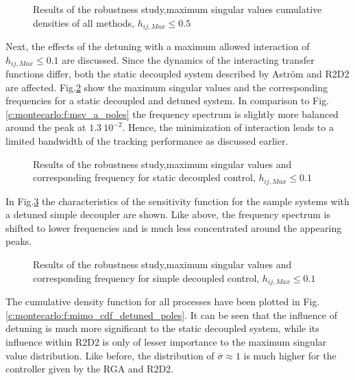 \begin{figure}[H]\centering

\caption{Results of the robustness study,maximum singular values cumulative densities of all methods, $h_{ij,Max} \leq 0.5$}
\label{c:montecarlo:f:mimo_cdf_poles}
\end{figure}

Next, the effects of the detuning with a maximum allowed interaction of $h_{ij,Max} \leq 0.1$ are discussed. Since the dynamics of the interacting transfer functions differ, both the static decoupled system described by Astr\"om and R2D2 are affected. Fig.\ref{c:montecarlo:f:msv_a_detuned_poles} show the maximum singular values and the corresponding frequencies for a static decoupled and detuned system. In comparison to Fig.\ref{c:montecarlo:f:msv_a_poles} the frequency spectrum is slightly more balanced around the peak at $1.3~10^{-2}$. Hence, the minimization of interaction leads to a limited bandwidth of the tracking performance as discussed earlier. 

\begin{figure}[H]\centering

\caption{Results of the robustness study,maximum singular values and corresponding frequency for static decoupled control, $h_{ij,Max} \leq 0.1$}
\label{c:montecarlo:f:msv_a_detuned_poles}
\end{figure}

In Fig.\ref{c:montecarlo:f:msv_d_detuned_poles} the characteristics of the sensitivity function for the sample systems with a detuned simple decoupler are shown. Like above, the frequency spectrum is shifted to lower frequencies and is much less concentrated around the appearing peaks.

\begin{figure}[H]\centering

\caption{Results of the robustness study,maximum singular values and corresponding frequency for simple decoupled control, $h_{ij,Max} \leq 0.1$}
\label{c:montecarlo:f:msv_d_detuned_poles}
\end{figure}

The cumulative density function for all processes have been plotted in Fig.\ref{c:montecarlo:f:mimo_cdf_detuned_poles}. It can be seen that the influence of detuning is much more significant to the static decoupled system, while its influence within R2D2 is only of lesser importance to the maximum singular value distribution. Like before, the distribution of $\overline{\sigma} \approx 1$ is much higher for the controller given by the RGA and R2D2.

